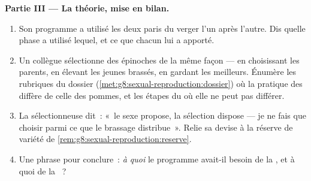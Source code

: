 \begin{problem}
\medskip\noindent\textbf{Partie III --- La théorie, mise en
bilan.}
\begin{enumerate}[resume]
  \item Son programme a utilisé les deux paris du verger l'un après
        l'autre. Dis quelle phase a utilisé lequel, et ce que
        chacun lui a apporté.
  \item Un collègue sélectionne des épinoches de la même façon ---
        en choisissant les parents, en élevant les jeunes brassés,
        en gardant les meilleurs. Énumère les rubriques du dossier
        (\cref{met:g8:sexual-reproduction:dossier}) où la pratique
        des  diffère de celle des pommes, et les étapes du
         où elle ne peut pas différer.
  \item La sélectionneuse dit~: «~le sexe propose, la sélection
        dispose --- je ne fais que choisir parmi ce que le brassage
        distribue~». Relie sa devise à la réserve de variété de
        \cref{rem:g8:sexual-reproduction:reserve}.
  \item Une phrase pour conclure~: \emph{à quoi} le programme
        avait-il besoin de la , et à quoi de la
        ~?
\end{enumerate}
\end{problem}
